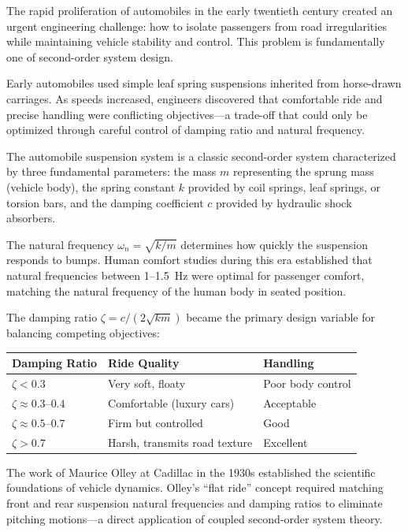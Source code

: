 The rapid proliferation of automobiles in the early twentieth century created an urgent engineering challenge: how to isolate passengers from road irregularities while maintaining vehicle stability and control. This problem is fundamentally one of second-order system design.

\begin{historicalbox}
Early automobiles used simple leaf spring suspensions inherited from horse-drawn carriages. As speeds increased, engineers discovered that comfortable ride and precise handling were conflicting objectives---a trade-off that could only be optimized through careful control of damping ratio and natural frequency.
\end{historicalbox}

The automobile suspension system is a classic second-order system characterized by three fundamental parameters: the mass $m$ representing the sprung mass (vehicle body), the spring constant $k$ provided by coil springs, leaf springs, or torsion bars, and the damping coefficient $c$ provided by hydraulic shock absorbers.

The natural frequency $\omega_n = \sqrt{k/m}$ determines how quickly the suspension responds to bumps. Human comfort studies during this era established that natural frequencies between 1--1.5~Hz were optimal for passenger comfort, matching the natural frequency of the human body in seated position.

The damping ratio $\zeta = c/(2\sqrt{km})$ became the primary design variable for balancing competing objectives:

\begin{center}
\begin{tabular}{lll}
\toprule
\textbf{Damping Ratio} & \textbf{Ride Quality} & \textbf{Handling} \\
\midrule
$\zeta < 0.3$ & Very soft, floaty & Poor body control \\
$\zeta \approx 0.3$--$0.4$ & Comfortable (luxury cars) & Acceptable \\
$\zeta \approx 0.5$--$0.7$ & Firm but controlled & Good \\
$\zeta > 0.7$ & Harsh, transmits road texture & Excellent \\
\bottomrule
\end{tabular}
\end{center}

The work of Maurice Olley at Cadillac in the 1930s established the scientific foundations of vehicle dynamics. Olley's ``flat ride'' concept required matching front and rear suspension natural frequencies and damping ratios to eliminate pitching motions---a direct application of coupled second-order system theory.


